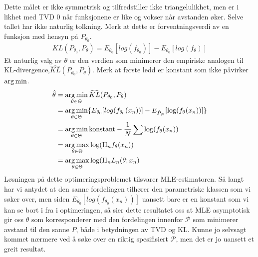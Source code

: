 Dette målet er ikke symmetrisk og tilfredstiller ikke triangelulikhet, men er i likhet med TVD 0 når funksjonene er like og vokser når avstanden øker. Selve tallet har ikke naturlig tolkning. Merk at dette er forventningsverdi av en funksjon med hensyn på $P_{\theta_0}$. 
\begin{align}
KL(P_{\theta_0},P_{\theta}) = E_{\theta_0}[log(f_{\theta_0})]-E_{\theta_0}[log(f_{\theta})]
\end{align}
Et naturlig valg av $\theta$ er den verdien som minimerer den empiriske analogen til KL-divergence,$\widehat{KL}(P_{\theta_0},P_{\theta})$. Merk at første ledd er konstant som ikke påvirker $\operatorname*{arg\,min}$.
\begin{align}
\hat{\theta} &= \operatorname*{arg\,min}_{\theta \in \Theta} \widehat{KL}(P_{\theta_0},P_{\theta}) \\
&= \operatorname*{arg\,min}_{\theta \in \Theta} \{ E_{\theta_0}[log(f_{\theta_0}(x_n))] - E_{\hat{P}_N}[\log(f_{\theta}(x_n))]\} \\
&=\operatorname*{arg\,min}_{\theta \in \Theta} \text{konstant}-\frac{1}{N}\sum \log(f_{\theta}(x_n)) \\ 
&= \operatorname*{arg\,max}_{\theta \in \Theta}  \log (\Pi_n f_{\theta}(x_n)) \\
&= \operatorname*{arg\,max}_{\theta \in \Theta}  \log (\Pi_n L_n(\theta;x_n)
\end{align}
Løsningen på dette optimeringsproblemet tilsvarer MLE-estimatoren. Så langt har vi antydet at den sanne fordelingen tilhører den parametriske klassen som vi søker over, men siden $ E_{\theta_0}[log(f_{\theta_0}(x_n))]$ uansett bare er en konstant som vi kan se bort i fra i optimeringen, så sier dette resultatet oss at MLE asymptotisk gir oss $\theta$ som korresponderer med den fordelingen innenfor $\mathscr{P}$ som minimerer avstand til den sanne $P$, både i betydningen av TVD og KL. Kunne jo selvsagt kommet nærmere ved å søke over en riktig spesifisiert $\mathscr{P}$, men det er jo uansett et greit resultat.
